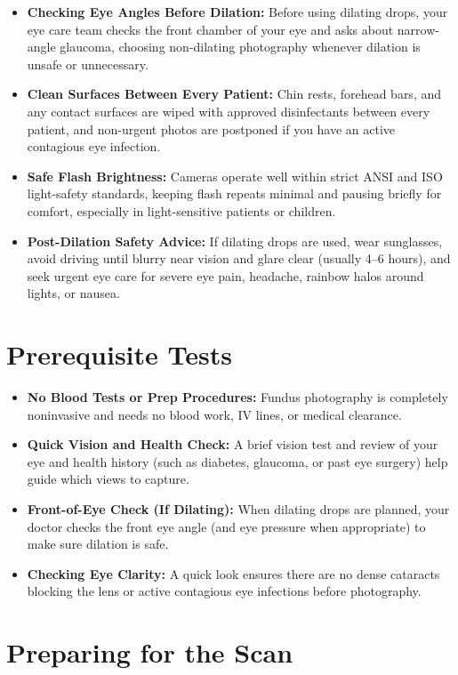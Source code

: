 \begin{itemize}
    \item \textbf{Checking Eye Angles Before Dilation:} Before using dilating drops, your eye care team checks the front chamber of your eye and asks about narrow-angle glaucoma, choosing non-dilating photography whenever dilation is unsafe or unnecessary.
    \item \textbf{Clean Surfaces Between Every Patient:} Chin rests, forehead bars, and any contact surfaces are wiped with approved disinfectants between every patient, and non-urgent photos are postponed if you have an active contagious eye infection.
    \item \textbf{Safe Flash Brightness:} Cameras operate well within strict ANSI and ISO light-safety standards, keeping flash repeats minimal and pausing briefly for comfort, especially in light-sensitive patients or children.
    \item \textbf{Post-Dilation Safety Advice:} If dilating drops are used, wear sunglasses, avoid driving until blurry near vision and glare clear (usually 4--6 hours), and seek urgent eye care for severe eye pain, headache, rainbow halos around lights, or nausea.
\end{itemize}

\section{Prerequisite Tests}

\begin{itemize}
    \item \textbf{No Blood Tests or Prep Procedures:} Fundus photography is completely noninvasive and needs no blood work, IV lines, or medical clearance.
    \item \textbf{Quick Vision and Health Check:} A brief vision test and review of your eye and health history (such as diabetes, glaucoma, or past eye surgery) help guide which views to capture.
    \item \textbf{Front-of-Eye Check (If Dilating):} When dilating drops are planned, your doctor checks the front eye angle (and eye pressure when appropriate) to make sure dilation is safe.
    \item \textbf{Checking Eye Clarity:} A quick look ensures there are no dense cataracts blocking the lens or active contagious eye infections before photography.
\end{itemize}

\section{Preparing for the Scan}

